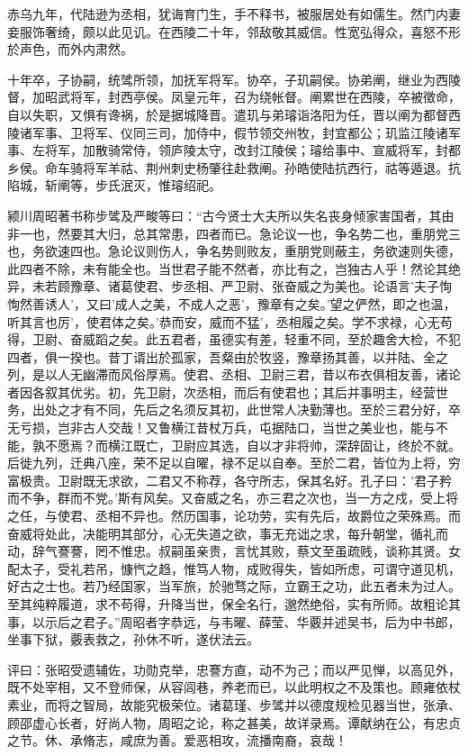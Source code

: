 \documentclass[12pt,UTF8]{ctexbook}
\begin{document}
赤乌九年，代陆逊为丞相，犹诲育门生，手不释书，被服居处有如儒生。然门内妻妾服饰奢绮，颇以此见讥。在西陵二十年，邻敌敬其威信。性宽弘得众，喜怒不形於声色，而外内肃然。

十年卒，子协嗣，统骘所领，加抚军将军。协卒，子玑嗣侯。协弟阐，继业为西陵督，加昭武将军，封西亭侯。凤皇元年，召为绕帐督。阐累世在西陵，卒被徵命，自以失职，又惧有谗祸，於是据城降晋。遣玑与弟璿诣洛阳为任，晋以阐为都督西陵诸军事、卫将军、仪同三司，加侍中，假节领交州牧，封宜都公；玑监江陵诸军事、左将军，加散骑常侍，领庐陵太守，改封江陵侯；璿给事中、宣威将军，封都乡侯。命车骑将军羊祜、荆州刺史杨肇往赴救阐。孙皓使陆抗西行，祜等遁退。抗陷城，斩阐等，步氏泯灭，惟璿绍祀。

颍川周昭著书称步骘及严畯等曰：“古今贤士大夫所以失名丧身倾家害国者，其由非一也，然要其大归，总其常患，四者而已。急论议一也，争名势二也，重朋党三也，务欲速四也。急论议则伤人，争名势则败友，重朋党则蔽主，务欲速则失德，此四者不除，未有能全也。当世君子能不然者，亦比有之，岂独古人乎！然论其绝异，未若顾豫章、诸葛使君、步丞相、严卫尉、张奋威之为美也。论语言'夫子恂恂然善诱人'，又曰'成人之美，不成人之恶'，豫章有之矣。'望之俨然，即之也温，听其言也厉'，使君体之矣。'恭而安，威而不猛'，丞相履之矣。学不求禄，心无苟得，卫尉、奋威蹈之矣。此五君者，虽德实有差，轻重不同，至於趣舍大检，不犯四者，俱一揆也。昔丁谞出於孤家，吾粲由於牧竖，豫章扬其善，以并陆、全之列，是以人无幽滞而风俗厚焉。使君、丞相、卫尉三君，昔以布衣俱相友善，诸论者因各叙其优劣。初，先卫尉，次丞相，而后有使君也；其后并事明主，经营世务，出处之才有不同，先后之名须反其初，此世常人决勤薄也。至於三君分好，卒无亏损，岂非古人交哉！又鲁横江昔杖万兵，屯据陆口，当世之美业也，能与不能，孰不愿焉？而横江既亡，卫尉应其选，自以才非将帅，深辞固让，终於不就。后徙九列，迁典八座，荣不足以自曜，禄不足以自奉。至於二君，皆位为上将，穷富极贵。卫尉既无求欲，二君又不称荐，各守所志，保其名好。孔子曰：'君子矜而不争，群而不党。'斯有风矣。又奋威之名，亦三君之次也，当一方之戍，受上将之任，与使君、丞相不异也。然历国事，论功劳，实有先后，故爵位之荣殊焉。而奋威将处此，决能明其部分，心无失道之欲，事无充诎之求，每升朝堂，循礼而动，辞气謇謇，罔不惟忠。叔嗣虽亲贵，言忧其败，蔡文至虽疏贱，谈称其贤。女配太子，受礼若吊，慷忾之趋，惟笃人物，成败得失，皆如所虑，可谓守道见机，好古之士也。若乃经国家，当军旅，於驰骛之际，立霸王之功，此五者未为过人。至其纯粹履道，求不苟得，升降当世，保全名行，邈然绝俗，实有所师。故粗论其事，以示后之君子。”周昭者字恭远，与韦曜、薛莹、华覈并述吴书，后为中书郎，坐事下狱，覈表救之，孙休不听，遂伏法云。

评曰：张昭受遗辅佐，功勋克举，忠謇方直，动不为己；而以严见惮，以高见外，既不处宰相，又不登师保，从容闾巷，养老而已，以此明权之不及策也。顾雍依杖素业，而将之智局，故能究极荣位。诸葛瑾、步骘并以德度规检见器当世，张承、顾邵虚心长者，好尚人物，周昭之论，称之甚美，故详录焉。谭献纳在公，有忠贞之节。休、承脩志，咸庶为善。爱恶相攻，流播南裔，哀哉！
\end{document}
